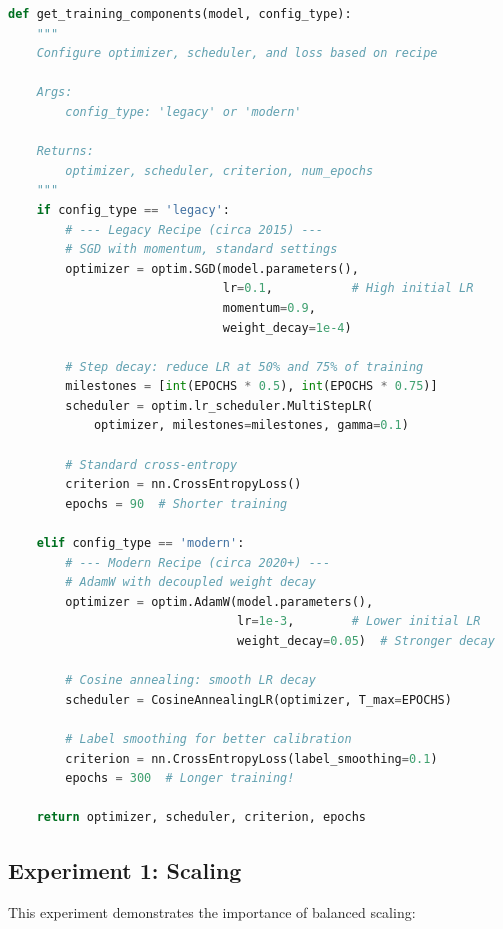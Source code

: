 \documentclass{article}
\begin{document}
\begin{lstlisting}[language=Python, caption=Training Configuration]
def get_training_components(model, config_type):
    """
    Configure optimizer, scheduler, and loss based on recipe
    
    Args:
        config_type: 'legacy' or 'modern'
    
    Returns:
        optimizer, scheduler, criterion, num_epochs
    """
    if config_type == 'legacy':
        # --- Legacy Recipe (circa 2015) ---
        # SGD with momentum, standard settings
        optimizer = optim.SGD(model.parameters(), 
                              lr=0.1,           # High initial LR
                              momentum=0.9,
                              weight_decay=1e-4)
        
        # Step decay: reduce LR at 50% and 75% of training
        milestones = [int(EPOCHS * 0.5), int(EPOCHS * 0.75)]
        scheduler = optim.lr_scheduler.MultiStepLR(
            optimizer, milestones=milestones, gamma=0.1)
        
        # Standard cross-entropy
        criterion = nn.CrossEntropyLoss()
        epochs = 90  # Shorter training
        
    elif config_type == 'modern':
        # --- Modern Recipe (circa 2020+) ---
        # AdamW with decoupled weight decay
        optimizer = optim.AdamW(model.parameters(),
                                lr=1e-3,        # Lower initial LR
                                weight_decay=0.05)  # Stronger decay
        
        # Cosine annealing: smooth LR decay
        scheduler = CosineAnnealingLR(optimizer, T_max=EPOCHS)
        
        # Label smoothing for better calibration
        criterion = nn.CrossEntropyLoss(label_smoothing=0.1)
        epochs = 300  # Longer training!
    
    return optimizer, scheduler, criterion, epochs
\end{lstlisting}

\subsection{Experiment 1: Scaling}

This experiment demonstrates the importance of balanced scaling:
\end{document}
